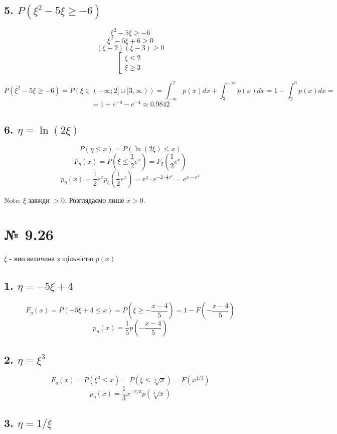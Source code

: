 \documentclass[11pt, a4paper]{article} %
\begin{document}
\subsection*{5. $P(\xi^2-5\xi\ge -6)$}

$$\xi^2-5\xi\ge -6$$
$$\xi^2-5\xi + 6 \ge 0$$
$$(\xi - 2)(\xi - 3) \ge 0$$
$$\left[ \begin{matrix}
    \xi \le 2\\
    \xi \ge 3
\end{matrix} \right.$$

$$P(\xi^2-5\xi\ge -6) = P(\xi \in (-\infty;2]\cup [3,\infty)) 
= \int_{-\infty}^2 p(x)dx + \int_3^{+\infty} p(x) dx 
= 1-\int_2^3 p(x) dx = $$
$$= 1 + e^{-6} - e^{-4} \approx 0.9842$$

\subsection*{6. $\eta = \ln (2\xi)$}

$$P(\eta\le x) = P(\ln (2\xi) \le x)$$
$$F_\eta(x) = P(\xi \le \frac{1}{2} e^x) = F_\xi(\frac{1}{2} e^x)$$
$$p_\eta(x) = \frac{1}{2} e^x p_\xi(\frac{1}{2} e^x) = e^x \cdot e^{-2\cdot\frac{1}{2} e^x} = e^{x-e^x}$$

Note: $\xi$ завжди $>0$. Розглядаємо лише $x>0$.

\section*{№ 9.26}
\begin{mdframed}
    $\xi$ - вип.величина з щільністю $p(x)$
\end{mdframed}

\subsection*{1. $\eta = -5\xi + 4$}

$$F_\eta(x) = P(-5\xi+4 \le x) = P(\xi \ge -\frac{x-4}{5}) = 1 - F(-\frac{x-4}{5})$$
$$p_\eta(x) = \frac{1}{5} p(-\frac{x-4}{5})$$

\subsection*{2. $\eta = \xi^3$}
$$F_\eta(x) = P(\xi^3 \le x) = P(\xi \le \sqrt[3]{x}) = F(x^{1/3})$$
$$p_\eta(x) = \frac{1}{3} x^{-2/3} p(\sqrt[3]{x})$$

\subsection*{3. $\eta = 1/\xi$}
\end{document}
